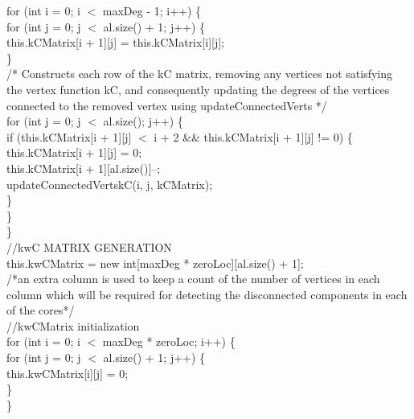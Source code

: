 \begin{ttfamily   }
\begin{scriptsize}
        \noindent for (int i = 0;   i $<$ maxDeg - 1;   i++) \{\\
            \noindent for (int j = 0;   j $<$ al.size() + 1;   j++) \{\\
                this.kCMatrix[i + 1][j] = this.kCMatrix[i][j];\\
            \}\\

            \noindent /*
              Constructs each row of the kC matrix, removing any vertices
              not satisfying the vertex function kC, and consequently updating the
              degrees of the vertices\\ connected to the removed vertex
              using updateConnectedVerts
             */\\
            \noindent for (int j = 0;   j $<$ al.size();   j++) \{\\
                if (this.kCMatrix[i + 1][j] $<$ i + 2 \&\& this.kCMatrix[i + 1][j] != 0) \{\\
                    this.kCMatrix[i + 1][j] = 0;\\
                    this.kCMatrix[i + 1][al.size()]--;\\
                    updateConnectedVertskC(i, j, kCMatrix);\\
                \}\\
            \}\\
        \}\\

        
        \noindent//kwC  MATRIX GENERATION\\
        this.kwCMatrix = new int[maxDeg * zeroLoc][al.size() + 1];\\
        \noindent /*an extra column is used to keep a count of the number of vertices in each column
        which will be required for detecting the disconnected components in each of the cores*/\\

        \noindent//kwCMatrix initialization\\
        \noindent for (int i = 0;   i $<$ maxDeg * zeroLoc;   i++) \{\\
            \noindent for (int j = 0;   j $<$ al.size() + 1;   j++) \{\\
                this.kwCMatrix[i][j] = 0;\\
            \}\\
        \}\\


\end{scriptsize}
\end{ttfamily   }
